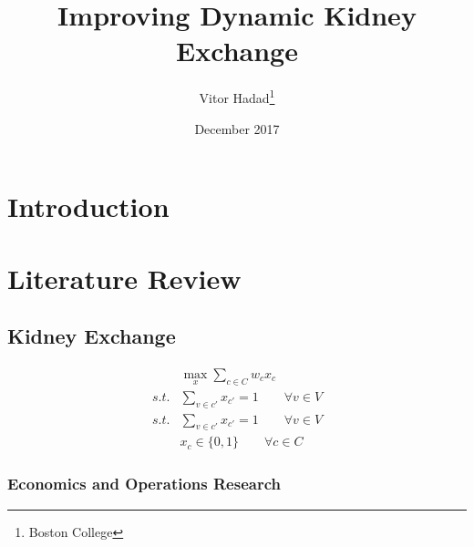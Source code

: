 \documentclass[12pt]{article}
\begin{document}
\begin{titlepage}
\title{Improving Dynamic Kidney Exchange}
\author{Vitor Hadad\thanks{Boston College}}
\date{December 2017}
\maketitle
\begin{abstract}

\bigskip
\end{abstract}
\setcounter{page}{0}
\thispagestyle{empty}
\end{titlepage}
\pagebreak 




\doublespacing


\section{Introduction} \label{sec:introduction}

\section{Literature Review} \label{sec:literature}

\subsection{Kidney Exchange} \label{sec:literature:subsec:kidney}


\begin{align}
  &\max_{x} \sum_{c \in C} w_{c} x_{c} \\
  s.t. &\sum_{v \in c'} x_{c'} = 1 \qquad \forall v \in V\\ 
  s.t. &\sum_{v \in c'} x_{c'} = 1 \qquad \forall v \in V\\ 
       &x_c \in \{ 0, 1\}  \qquad \forall c \in C
\end{align}



\subsubsection{Economics and Operations Research}
\end{document}
